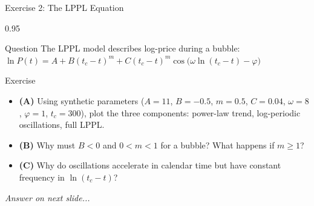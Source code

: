\documentclass[9pt, aspectratio=169, t]{beamer}
\begin{document}
\begin{frame}{Exercise 2: The LPPL Equation}
    \begin{cminipage}{0.95\textwidth}
    \begin{alertblock}{Question}
        The LPPL model describes log-price during a bubble:
        $\ln P(t) = A + B(t_c - t)^m + C(t_c - t)^m \cos\!\bigl(\omega \ln(t_c - t) - \varphi\bigr)$
    \end{alertblock}

    \vspace{0.1cm}

    \begin{block}{Exercise}
        \begin{itemize}\setlength{\itemsep}{2pt}
            \item \textcolor{MainBlue}{\textbf{(A)}} Using synthetic parameters ($A{=}11$, $B{=}{-}0.5$, $m{=}0.5$, $C{=}0.04$, $\omega{=}8$, $\varphi{=}1$, $t_c{=}300$), plot the three components: power-law trend, log-periodic oscillations, full LPPL.
            \item \textcolor{MainBlue}{\textbf{(B)}} Why must $B < 0$ and $0 < m < 1$ for a bubble? What happens if $m \geq 1$?
            \item \textcolor{MainBlue}{\textbf{(C)}} Why do oscillations accelerate in calendar time but have constant frequency in $\ln(t_c - t)$?
        \end{itemize}
    \end{block}

    \vspace{0.1cm}

    \begin{center}
        \textit{Answer on next slide...}
    \end{center}
    \end{cminipage}
\end{frame}
\end{document}
